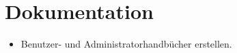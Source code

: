 \documentclass[../main.tex]{subfiles}
\begin{document}
\section{Dokumentation}

\begin{itemize}
  \item Benutzer- und Administratorhandbücher erstellen.
\end{itemize}
\end{document}
